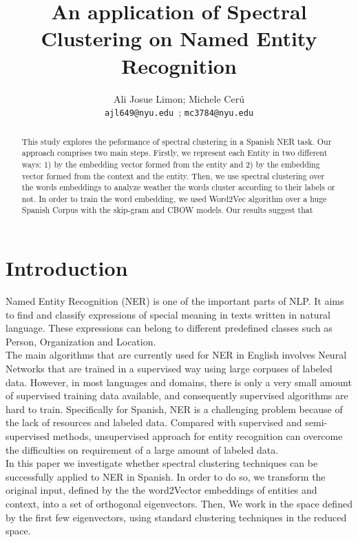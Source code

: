\documentclass[]{article}
\title{An application of Spectral Clustering on Named Entity Recognition}
\author{Ali Josue Limon; Michele Cer\'u \\ 
\texttt{ajl649@nyu.edu }; \texttt{mc3784@nyu.edu}
}
\begin{document}
\maketitle
\newcommand{\slugmaster}{%
\slugger{siads}{xxxx}{xx}{x}{x---x}}%



\begin{abstract}
This study explores the peformance of spectral clustering in a Spanish NER task. Our approach comprises two main steps. Firstly, we represent each Entity in two different ways: 1) by the embedding vector formed from the entity and 2) by the embedding vector formed from the context and the entity.  Then, we use spectral clustering over the words embeddings  to analyze weather the words cluster according to their labels or not.  In order to train the word embedding, we used Word2Vec algorithm over a huge Spanish Corpus with the skip-gram and CBOW models.  Our results suggest that 


\end{abstract}

\section{Introduction}

Named Entity Recognition (NER) is one of the important parts of NLP. It aims to find and classify expressions of special meaning in texts written in natural language.  These expressions can belong to different predefined classes such as Person, Organization and Location. \\

The main algorithms that are currently used for NER in English involves Neural Networks that are trained in a supervised way using large corpuses of labeled data. However, in most languages and domains, there is only a very small amount of supervised training data available, and consequently supervised algorithms are hard to train. Specifically for Spanish, NER is a challenging problem because of the lack of resources and labeled data. Compared with supervised and semi-supervised methods, unsupervised approach for entity recognition can overcome the difficulties on requirement of a large amount of labeled data. \\

In this paper we investigate whether spectral clustering techniques can be successfully applied to NER in Spanish. In order to do so, we transform the original input, defined by the the word2Vector embeddings of entities and context, into a set of orthogonal eigenvectors. Then, We work in the space defined by the first few eigenvectors, using standard clustering techniques in the reduced space. \\
\end{document}
